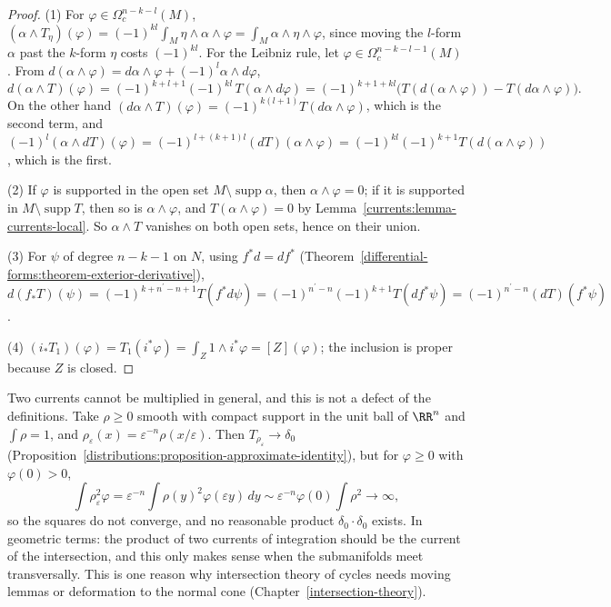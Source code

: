 \begin{proof}
(1) For $\varphi \in \Omega^{n-k-l}_c(M)$, $(\alpha \wedge T_\eta)(\varphi) = (-1)^{kl}\int_M\eta \wedge \alpha \wedge \varphi = \int_M\alpha \wedge \eta \wedge \varphi$, since moving the $l$-form $\alpha$ past the
$k$-form $\eta$ costs $(-1)^{kl}$. For the Leibniz rule, let $\varphi \in \Omega^{n-k-l-1}_c(M)$. From $d(\alpha \wedge \varphi) = d\alpha \wedge \varphi + (-1)^l\alpha \wedge d\varphi$,
\[
d(\alpha \wedge T)(\varphi) = (-1)^{k+l+1}(-1)^{kl}\,T(\alpha \wedge d\varphi) = (-1)^{k+1+kl}\bigl(T(d(\alpha \wedge \varphi)) - T(d\alpha \wedge \varphi)\bigr).
\]
On the other hand $(d\alpha \wedge T)(\varphi) = (-1)^{k(l+1)}T(d\alpha \wedge \varphi)$, which is the second term, and
$(-1)^l(\alpha \wedge dT)(\varphi) = (-1)^{l + (k+1)l}(dT)(\alpha \wedge \varphi) = (-1)^{kl}(-1)^{k+1}T(d(\alpha \wedge \varphi))$, which is the first.

(2) If $\varphi$ is supported in the open set $M \setminus \operatorname{supp}\alpha$, then $\alpha \wedge \varphi = 0$; if it is supported in $M \setminus \operatorname{supp}T$, then so is $\alpha \wedge \varphi$, and
$T(\alpha \wedge \varphi) = 0$ by Lemma~\ref{currents:lemma-currents-local}. So $\alpha \wedge T$ vanishes on both open sets, hence on their union.

(3) For $\psi$ of degree $n - k - 1$ on $N$, using $f^*d = df^*$ (Theorem~\ref{differential-forms:theorem-exterior-derivative}),
$d(f_*T)(\psi) = (-1)^{k + n^{\prime} - n + 1}T(f^*d\psi) = (-1)^{n^{\prime} - n}(-1)^{k+1}T(df^*\psi) = (-1)^{n^{\prime} - n}(dT)(f^*\psi)$.

(4) $(i_*T_1)(\varphi) = T_1(i^*\varphi) = \int_Z1 \wedge i^*\varphi = [Z](\varphi)$; the inclusion is proper because $Z$ is closed.
\end{proof}

\begin{remark}\label{currents:remark-current-products}
Two currents cannot be multiplied in general, and this is not a defect of the definitions. Take $\rho \geq 0$ smooth with compact support in the unit ball of $\RR^n$ and $\int\rho = 1$, and
$\rho_\varepsilon(x) = \varepsilon^{-n}\rho(x/\varepsilon)$. Then $T_{\rho_\varepsilon} \to \delta_0$ (Proposition~\ref{distributions:proposition-approximate-identity}), but for $\varphi \geq 0$ with $\varphi(0) > 0$,
\[
\int\rho_\varepsilon^2\varphi = \varepsilon^{-n}\int\rho(y)^2\varphi(\varepsilon y)\,dy \sim \varepsilon^{-n}\varphi(0)\int\rho^2 \to \infty,
\]
so the squares do not converge, and no reasonable product $\delta_0 \cdot \delta_0$ exists. In geometric terms: the product of two currents of integration should be the current of the
intersection, and this only makes sense when the submanifolds meet transversally. This is one reason why intersection theory of cycles needs moving lemmas or deformation to the normal cone
(Chapter~\ref{intersection-theory}).
\end{remark}

